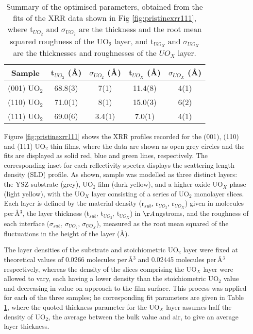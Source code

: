 \documentclass[twocolumn,prl,nobalancelastpage,aps,10pt]{revtex4-1}
\begin{document}
\begin{table}[h!]
\centering %
{\renewcommand{\arraystretch}{1.5}
\begin{tabular}{c c c c c} %
\hline \hline %
    Sample& t$_{UO_2}$ (\AA) & $\sigma_{UO_2}$ (\AA) & t$_{UO_X}$ (\AA) & $\sigma_{UO_X}$ (\AA) \\ [0.5ex] %
\hline %
(001) UO$_2$ & 68.8(3) & 7(1)& 11.4(8) & 4(1)  \\ %
(110) UO$_2$ & 71.0(1)& 8(1)& 15.0(3)& 6(2)   \\ %
(111) UO$_2$ & 69.0(6)& 3.4(1)& 7.0(1)& 4(1)   \\ %

\hline %
\end{tabular}}
\caption{Summary of the optimised parameters, obtained from the fits of the XRR data shown in Fig \ref{fig:pristinexrr111}, where t$_{UO_2}$ and $\sigma_{UO_2}$ are the thickness and the root mean squared roughness of the UO$_2$ layer, and t$_{UO_X}$ and  $\sigma_{UO_X}$ are the thicknesses and roughnesses of the $UO_X$ layer.} %
\label{tab:reffitpars1}
\end{table}

Figure \ref{fig:pristinexrr111} shows the XRR profiles recorded for the (001), (110) and (111) UO$_2$ thin films, where the data are shown as open grey circles and the fits are displayed as solid red, blue and green lines, respectively. The corresponding inset for each reflectivity spectra displays the scattering length density (SLD) profile. As shown, sample was modelled as three distinct layers: the YSZ substrate (grey), UO$_2$ film (dark yellow), and a higher oxide UO$_X$ phase (light yellow), with the UO$_X$ layer consisting of a series of UO$_2$ monolayer slices. Each layer is defined by the material density  (r$_{sub}$, r$_{UO_2}$, r$_{UO_X}$) given in molecules per\,\AA$^3$, the layer thickness (t$_{sub}$, t$_{UO_2}$, t$_{UO_X}$) in $\AA$ngstroms, and the roughness of each interface ($\sigma$$_{sub}$, $\sigma$$_{UO_2}$, $\sigma$$_{UO_X}$), measured as the root mean squared of the fluctuations in the height of the layer (\AA).

The layer densities of the substrate and stoichiometric UO$_2$ layer were fixed at theoretical values of  0.0266 molecules per\,\AA$^3$ and 0.02445 molecules per\,\AA$^3$ respectively, whereas the density of the slices comprising the UO$_X$ layer were allowed to vary, each having a lower density than the stoichiometric UO$_2$ value and decreasing in value on approach to the film surface. This process was applied for each of the three samples; he corresponding fit parameters are given in Table \ref{tab:reffitpars1}, where the quoted thickness parameter for the UO$_X$ layer assumes half the density of UO$_2$, the average between the bulk value and air, to give an average layer thickness.
\end{document}
